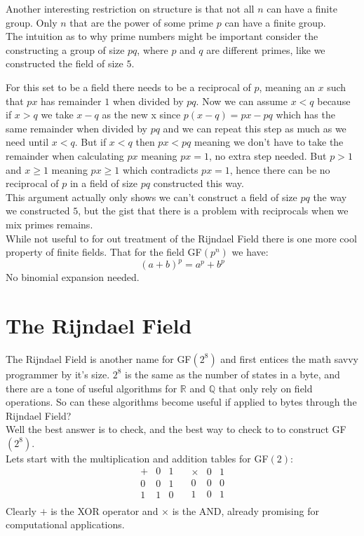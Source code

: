 Another interesting restriction on structure is that not all $n$ can have a finite group.
Only $n$ that are the power of some prime $p$ can have a finite group.
\\

The intuition as to why prime numbers might be important consider the constructing a group of size $pq$, where $p$ and $q$ are different primes, like we constructed the field of size $5$.

For this set to be a field there needs to be a reciprocal of $p$, meaning an $x$ such that $px$ has remainder $1$ when divided by $pq$. 
Now we can assume $x < q$ because if $x>q$ we take $x-q$ as the new x since $p(x-q) = px-pq$ which has the same remainder when divided by $pq$ and we can repeat this step as much as we need until $x < q$.
But if $x <q$ then $px < pq$ meaning we don't have to take the remainder when calculating $px$ meaning $px = 1$, no extra step needed.
But $p>1$ and $x\geq 1$ meaning $px \geq 1$ which contradicts $px = 1$, 
hence there can be no reciprocal of $p$ in a field of size $pq$ constructed this way.
\\

This argument actually only shows we can't construct a field of size $pq$ the way we constructed $5$,
but the gist that there is a problem with reciprocals when we mix primes remains.
\\

While not useful to for out treatment of the Rijndael Field there is one more cool property of finite fields.
That for the field GF$(p^n)$ we have:
\[(a+b)^p = a^p+b^p\]
No binomial expansion needed.
\section{The Rijndael Field}
The Rijndael Field is another name for GF$(2^8)$ and first entices the math savvy programmer by it's size.
$2^8$ is the same as the number of states in a byte,
and there are a tone of useful algorithms for $\mathbb{R}$ and $\mathbb{Q}$ that only rely on field operations.
So can these algorithms become useful if applied to bytes through the Rijndael Field?
\\

Well the best answer is to check,
and the best way to check to to construct GF$(2^8)$.
\\

Lets start with the multiplication and addition tables for GF$(2)$:
\[
\begin{array}{c|cc}
	+& 0 & 1 \\
	\hline 
	0&0&1\\
	1&1&0\\
\end{array}
\quad
\begin{array}{c|ccccc}
	\times & 0 & 1 \\
	\hline 
	0&0&0\\
	1&0&1\\
\end{array}
\]
Clearly $+$ is the XOR operator and $\times$ is the AND, already promising for computational applications.
\\

